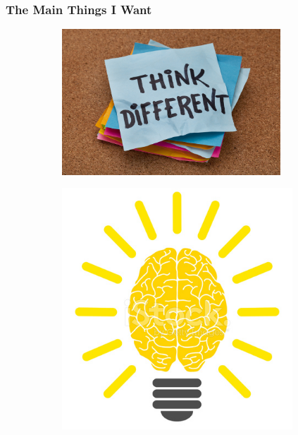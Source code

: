 \documentclass{beamer}
\begin{document}
\begin{frame}
  \frametitle{The Main Things I Want}
  \begin{figure}[t]
    \begin{subfigure}{0.45\textwidth}
      \includegraphics[width=0.9\textwidth]{images/think-different.jpg}
    \end{subfigure}
    \begin{subfigure}{0.45\textwidth}
      \includegraphics[width=0.95\textwidth]{images/brain.jpg}
    \end{subfigure}
  \end{figure}
  
\end{frame}
\end{document}
